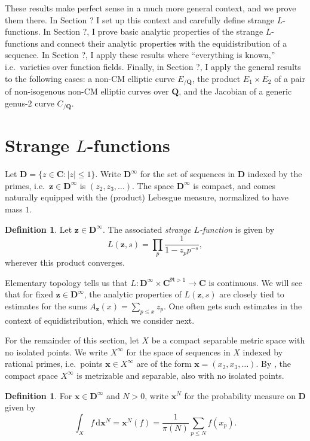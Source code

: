 \documentclass{article}
\newcommand{\bC}{\mathbf{C}}
\newcommand{\bD}{\mathbf{D}}
\newcommand{\bQ}{\mathbf{Q}}
\newcommand{\bx}{{\boldsymbol x}}
\newcommand{\bz}{{\boldsymbol z}}
\newcommand{\dd}{\mathrm{d}}
\theoremstyle{definition}
\newtheorem{definition}[subsection]{Definition}
\begin{document}
These results make perfect sense in a much more general context, and we
prove them there. In Section ? I set up this context and 
carefully define strange $L$-functions. In Section ?, I 
prove basic analytic properties of the strange $L$-functions and 
connect their analytic properties with the equidistribution of a sequence. 
In Section ?, I apply these results where ``everything is 
known,'' i.e.~varieties over function fields.
Finally, in Section ?, I apply the general results to the 
following cases: a non-CM elliptic curve $E_{/\bQ}$, the product 
$E_1\times E_2$ of a pair of non-isogenous non-CM elliptic curves over $\bQ$, 
and the Jacobian of a generic genus-$2$ curve $C_{/\bQ}$. 





\section{Strange $L$-functions}\label{sec:strange-L}

Let $\bD=\{z\in \bC : |z|\leqslant 1\}$. Write $\bD^\infty$ for the set of 
sequences in $\bD$ indexed by the primes, i.e.~$\bz\in\bD^\infty$ is 
$(z_2,z_3,\dots)$. The space $\bD^\infty$ is compact, and comes naturally 
equipped with the (product) Lebesgue measure, normalized to have mass $1$. 

\begin{definition}
Let $\bz\in\bD^\infty$. The associated \emph{strange $L$-function} is given by 
\[
	L(\bz,s) = \prod_p \frac{1}{1-z_p p^{-s}} ,
\]
wherever this product converges. 
\end{definition}

Elementary topology tells us that $L\colon \bD^\infty\times \bC^{\Re>1}\to \bC$ 
is continuous. 
We will see that for fixed $\bz\in \bD^\infty$, the analytic properties of 
$L(\bz,s)$ are closely tied to 
estimates for the sums $A_\bz(x) = \sum_{p\leqslant x} z_p$. One 
often gets such estimates in the context of equidistribution, which we consider 
next.

For the remainder of this section, let $X$ be a compact separable metric space with no 
isolated points. We write $X^\infty$ for the space of sequences in $X$ indexed 
by rational primes, i.e.~points $\bx\in X^\infty$ are of the form 
$\bx=(x_2,x_3,\dots)$. By \cite[Cor.2.3.16, Th.4.2.2]{engelking-1989}, the 
compact space $X^\infty$ is metrizable and separable, also with no isolated 
points. 

\begin{definition}
For $\bx\in \bD^\infty$ and $N>0$, write $\bx^N$ for the probability measure on 
$\bD$ given by 
\[
	\int_X f\, \dd \bx^N = \bx^N(f) = \frac{1}{\pi(N)} \sum_{p\leqslant N} f(x_p) .
\]
\end{definition}
\end{document}
